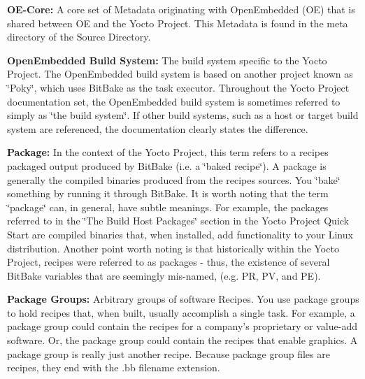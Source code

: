 \begin{DoxyItemize}
\begin{DoxyItemize}
\end{DoxyItemize}
\item {\bfseries O\+E-\/\+Core\+:} A core set of Metadata originating with Open\+Embedded (OE) that is shared between OE and the Yocto Project. This Metadata is found in the meta directory of the Source Directory.
\item {\bfseries Open\+Embedded Build System\+:} The build system specific to the Yocto Project. The Open\+Embedded build system is based on another project known as \char`\"{}\+Poky\char`\"{}, which uses Bit\+Bake as the task executor. Throughout the Yocto Project documentation set, the Open\+Embedded build system is sometimes referred to simply as \char`\"{}the build system\char`\"{}. If other build systems, such as a host or target build system are referenced, the documentation clearly states the difference.
\item {\bfseries Package\+:} In the context of the Yocto Project, this term refers to a recipe\textquotesingle{}s packaged output produced by Bit\+Bake (i.\+e. a \char`\"{}baked recipe\char`\"{}). A package is generally the compiled binaries produced from the recipe\textquotesingle{}s sources. You \char`\"{}bake\char`\"{} something by running it through Bit\+Bake. It is worth noting that the term \char`\"{}package\char`\"{} can, in general, have subtle meanings. For example, the packages referred to in the \char`\"{}\+The Build Host Packages\char`\"{} section in the Yocto Project Quick Start are compiled binaries that, when installed, add functionality to your Linux distribution. Another point worth noting is that historically within the Yocto Project, recipes were referred to as packages -\/ thus, the existence of several Bit\+Bake variables that are seemingly mis-\/named, (e.\+g. PR, PV, and PE).
\item {\bfseries Package Groups\+:} Arbitrary groups of software Recipes. You use package groups to hold recipes that, when built, usually accomplish a single task. For example, a package group could contain the recipes for a company’s proprietary or value-\/add software. Or, the package group could contain the recipes that enable graphics. A package group is really just another recipe. Because package group files are recipes, they end with the .bb filename extension.

\end{DoxyItemize}
